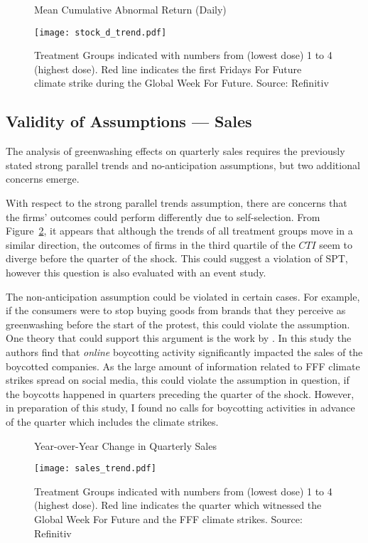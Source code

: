 \documentclass[12pt]{article}
\begin{document}
\begin{figure}[t]
    \caption{Mean Cumulative Abnormal Return (Daily)}\label{fig:stock_trend}
    \centering
    \texttt{[image: stock\_d\_trend.pdf]}
    \captionsetup{font=footnotesize}
    \caption*{Treatment Groups indicated with numbers from (lowest dose) 1 to 4 (highest dose). Red line indicates the first Fridays For Future climate strike during the Global Week For Future. Source: Refinitiv}
\end{figure}

\subsection{Validity of Assumptions --- Sales}

The analysis of greenwashing effects on quarterly sales requires the previously stated strong parallel trends and no-anticipation assumptions, but two additional concerns emerge.

With respect to the strong parallel trends assumption, there are concerns that the firms' outcomes could perform differently due to self-selection. From Figure~\ref{fig:sales_trend}, it appears that although the trends of all treatment groups move in a similar direction, the outcomes of firms in the third quartile of the $CTI$ seem to diverge before the quarter of the shock. This could suggest a violation of SPT, however this question is also evaluated with an event study.

The non-anticipation assumption could be violated in certain cases. For example, if the consumers were to stop buying goods from brands that they perceive as greenwashing before the start of the protest, this could violate the assumption. One theory that could support this argument is the work by \textcite{liaukonyteFrontiersSpillingBeans2023}. In this study the authors find that \textit{online} boycotting activity significantly impacted the sales of the boycotted companies. As the large amount of information related to FFF climate strikes spread on social media, this could violate the assumption in question, if the boycotts happened in quarters preceding the quarter of the shock. However, in preparation of this study, I found no calls for boycotting activities in advance of the quarter which includes the climate strikes. 


\begin{figure}[t]
    \caption{Year-over-Year Change in Quarterly Sales}\label{fig:sales_trend}
    \centering
    \texttt{[image: sales\_trend.pdf]}
    \captionsetup{font=footnotesize}
    \caption*{Treatment Groups indicated with numbers from (lowest dose) 1 to 4 (highest dose). Red line indicates the quarter which witnessed the Global Week For Future and the FFF climate strikes. Source: Refinitiv}
\end{figure}
\end{document}
